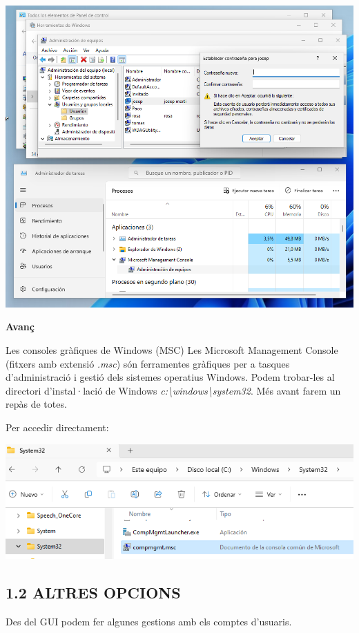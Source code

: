 \documentclass[
  a4paper,
]{article}
\begin{document}
\includegraphics{png/2PaneldeControlHerramientasdeWindowsAdministradordeEquiposUsuariosygruposlocales.png}

\textbf{Avanç}

Les consoles gràfiques de Windows (MSC) Les Microsoft Management Console
(fitxers amb extensió \emph{.msc}) són ferramentes gràfiques per a
tasques d'administració i gestió dels sistemes operatius Windows. Podem
trobar-les al directori d'instal·lació de Windows
\emph{c:\textbackslash windows\textbackslash system32}. Més avant farem
un repàs de totes.

Per accedir directament:

\includegraphics{png/fitxerCompmgmt.png}

\subsection{1.2 ALTRES OPCIONS}\label{altres-opcions}

Des del GUI podem fer algunes gestions amb els comptes d'usuaris.
\end{document}
